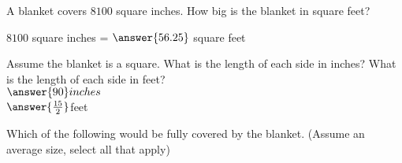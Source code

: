 \documentclass{ximera}
\author{Carolyn Johns}
\begin{document}
  \begin{exercise}
A blanket covers $8100$ square inches. How big is the blanket in square feet? 

$8100$ square inches = $\answer{56.25}$ square feet
\begin{exercise}
Assume the blanket is a square. What is the length of each side in inches? What is the length of each side in feet?\\
$\answer{90}inches$\\
$\answer{\frac{15}{2}}$feet
\begin{exercise}
Which of the following would be fully covered by the blanket. (Assume an average size, select all that apply)

\begin{selectAll}


\end{selectAll}
\end{exercise}
\end{exercise}
 \end{exercise}
\end{document}
